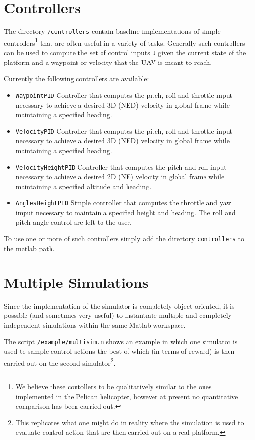 \documentclass[a4paper,11pt]{report}
\begin{document}
\section{Controllers}

The directory \texttt{/controllers} contain baseline implementations of simple controllers\footnote{We believe these contollers to be qualitatively similar to the ones implemented in the Pelican helicopter, however at present no quantitative comparison has been carried out.} that are often useful in a variety of tasks. Generally such controllers can be used to compute the set of control inputs \texttt{U} given the current state of the platform and a waypoint or velocity that the UAV is meant to reach. 

Currently the following controllers are available:
\begin{itemize}
\item \texttt{WaypointPID} Controller that computes the pitch, roll and throttle input necessary to achieve a desired 3D (NED) velocity in global frame while maintaining a specified heading.
\item \texttt{VelocityPID} Controller that computes the pitch, roll and throttle input necessary to achieve a desired 3D (NED) velocity in global frame while maintaining a specified heading.
\item \texttt{VelocityHeightPID} Controller that computes the pitch and roll input necessary to achieve a desired 2D (NE) velocity in global frame while maintaining a specified altitude and heading.
\item \texttt{AnglesHeightPID} Simple controller that computes the throttle and yaw imput necessary to maintain a specified height and heading. The roll and pitch angle control are left to the user.
\end{itemize}

To use one or more of such controllers simply add the directory \texttt{controllers} to the matlab path.

\section{Multiple Simulations}

Since the implementation of the simulator is completely object oriented, it is possible (and sometimes very useful) to instantiate multiple and completely independent simulations within the same Matlab workspace.  

The script \texttt{/example/multisim.m} shows an example in which one simulator is used to sample control actions the best of which (in terms of reward) is then carried out on the second simulator\footnote{This replicates what one might do in reality where the simulation is used to evaluate control action that are then carried out on a real platform.}. 
\end{document}
